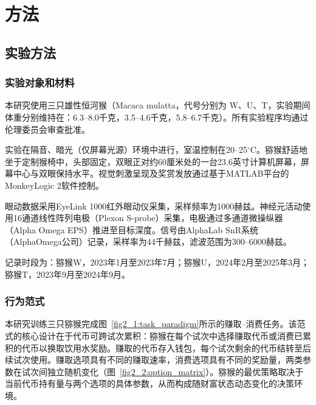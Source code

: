 \chapter{方法}\label{chap2:methods}

\section{实验方法}\label{chap2:methods_exp}
\subsection{实验对象和材料}\label{chap2:methods_exp_materials}
本研究使用三只雄性恒河猴（Macaca mulatta，代号分别为 W、U、T，实验期间体重分别维持在：6.3--8.0千克，3.5--4.6千克，5.8--6.7千克）。所有实验程序均通过伦理委员会审查批准。

实验在隔音、暗光（仅屏幕光源）环境中进行，室温控制在20--25$^\circ$C。猕猴舒适地坐于定制猴椅中，头部固定，双眼正对约60厘米处的一台23.6英寸计算机屏幕，屏幕中心与双眼保持水平。视觉刺激呈现及奖赏发放通过基于MATLAB平台的MonkeyLogic 
2软件控制。

眼动数据采用EyeLink 1000红外眼动仪采集，采样频率为1000赫兹。神经元活动使用16通道线性阵列电极（Plexon S-probe）采集，电极通过多通道微操纵器（Alpha Omega EPS）推进至目标深度。信号由AlphaLab SnR系统（AlphaOmega公司）记录，采样率为44千赫兹，滤波范围为300--6000赫兹。

记录时段为：猕猴W，2023年1月至2023年7月；猕猴U，2024年2月至2025年3月；猕猴T，2023年9月至2024年9月。

\subsection{行为范式}\label{chap2:methods_exp_paradigm}

本研究训练三只猕猴完成图~\ref{fig2_1:task_paradigm}所示的赚取–消费任务。该范式的核心设计在于代币可跨试次累积：猕猴在每个试次中选择赚取代币或消费已累积的代币以换取饮用水奖励。赚取的代币存入钱包，每个试次剩余的代币结转至后续试次使用。赚取选项具有不同的赚取速率，消费选项具有不同的奖励量，两类参数在试次间独立随机变化（图~\ref{fig2_2:option_matrix}）。猕猴的最优策略取决于当前代币持有量与两个选项的具体参数，从而构成随财富状态动态变化的决策环境。

